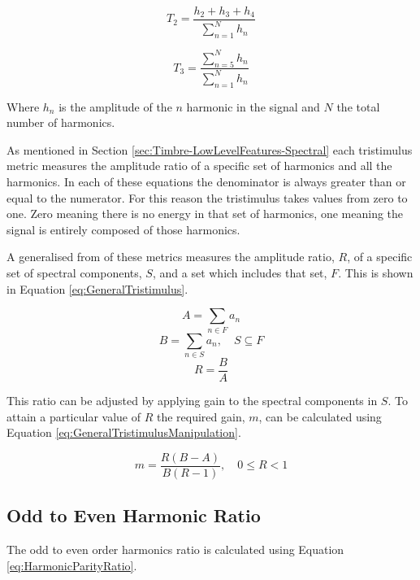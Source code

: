 		\begin{equation}
			T_{2} = \frac{h_{2} + h_{3} + h_{4}}{\sum_{n = 1}^{N} h_{n}}
			\label{eq:Tristimulus2}
		\end{equation}

		\begin{equation}
			T_{3} = \frac{\sum_{n = 5}^{N} h_{n}}{\sum_{n = 1}^{N} h_{n}}
			\label{eq:Tristimulus3}
		\end{equation}

		Where $h_{n}$ is the amplitude of the $n$ harmonic in the signal and $N$ the total number of
		harmonics.

		As mentioned in Section \ref{sec:Timbre-LowLevelFeatures-Spectral} each tristimulus metric measures the
		amplitude ratio of a specific set of harmonics and all the harmonics. In each of these equations the
		denominator is always greater than or equal to the numerator. For this reason the tristimulus takes values
		from zero to one. Zero meaning there is no energy in that set of harmonics, one meaning the signal is
		entirely composed of those harmonics.

		A generalised from of these metrics measures the amplitude ratio, $R$, of a specific set of spectral
		components, $S$, and a set which includes that set, $F$. This is shown in Equation
		\ref{eq:GeneralTristimulus}.

		\[ A = \sum_{n \in F} a_{n} \]
		\[ B = \sum_{n \in S} a_{n}, \quad S \subseteq F \]
		\begin{equation}
			R = \frac{B}{A}
			\label{eq:GeneralTristimulus}
		\end{equation}

		This ratio can be adjusted by applying gain to the spectral components in $S$. To attain a particular value
		of $R$ the required gain, $m$, can be calculated using Equation \ref{eq:GeneralTristimulusManipulation}.

		\begin{equation}
			m = \frac{R(B - A)}{B(R - 1)}, \quad 0 \leq R < 1
			\label{eq:GeneralTristimulusManipulation}
		\end{equation}

	\subsection{Odd to Even Harmonic Ratio}
	\label{sec:FetureControl-Parameterisation-HarmonicParityRatio}
		The odd to even order harmonics ratio is calculated using Equation \ref{eq:HarmonicParityRatio}.
		
